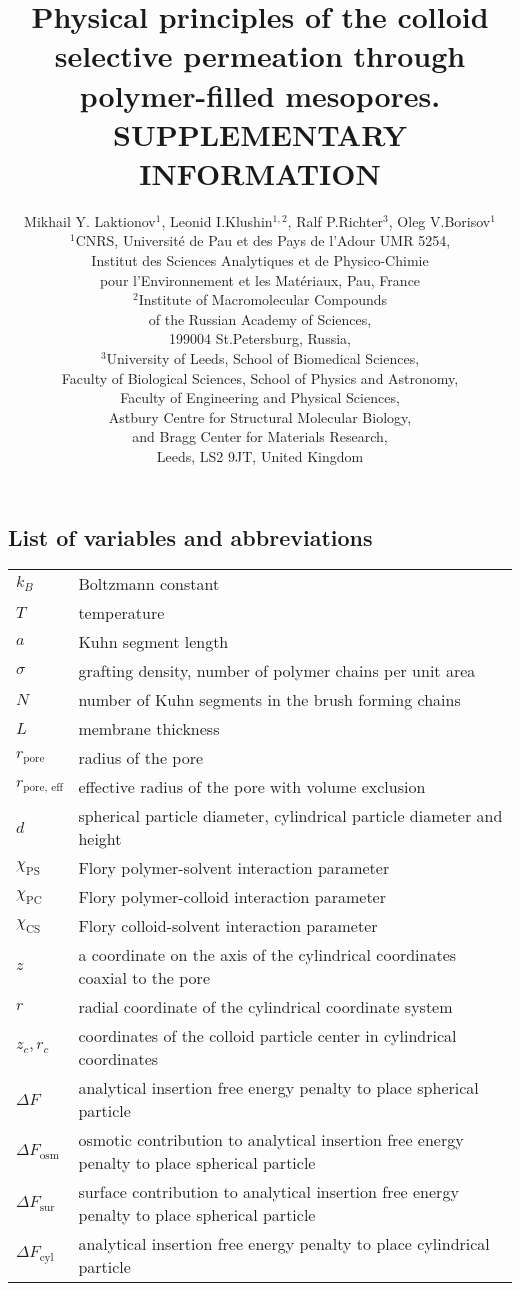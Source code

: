 \documentclass[10pt, a4paper]{article}
\title{Physical principles of the colloid selective permeation through polymer-filled mesopores.\\
        SUPPLEMENTARY INFORMATION}
\author{Mikhail Y. Laktionov$^1$, Leonid I.Klushin$^{1,2}$, Ralf P.Richter$^3$, Oleg V.Borisov$^1$\\
$^{1}$CNRS, Universit\'e de Pau et des Pays de l'Adour UMR 5254,\\
Institut des Sciences Analytiques et de Physico-Chimie\\
pour l'Environnement et les Mat\'eriaux, Pau, France \\
$^{2}$Institute of Macromolecular Compounds \\
of the Russian Academy of Sciences, \\
199004 St.Petersburg, Russia,\\
$^{3}$University of Leeds, School of Biomedical Sciences, \\
Faculty of Biological Sciences, 
School of Physics and Astronomy, \\
Faculty of Engineering and Physical Sciences,\\  
Astbury Centre for Structural Molecular Biology,\\ 
and Bragg Center for Materials Research,\\ 
Leeds, LS2 9JT, United Kingdom}
\begin{document}
\maketitle

\subsection*{List of variables and abbreviations}

\begin{tabularx}{\linewidth}{l l}
$k_B$ & Boltzmann constant \\
$T$ & temperature \\
$a$ & Kuhn segment length \\
$\sigma$ & grafting density, number of polymer chains per unit area \\
$N$ & number of Kuhn segments in the brush forming chains \\
$L$ & membrane thickness \\
$r_{\textrm{pore}}$ & radius of the pore \\
$r_{\textrm{pore, eff}}$ & effective radius of the pore with volume exclusion \\
$d$ & spherical particle diameter, cylindrical particle diameter and height \\ 
$\chi_{\textrm{PS}}$ & Flory polymer-solvent interaction parameter  \\
$\chi_{\textrm{PC}}$ & Flory polymer-colloid interaction parameter  \\
$\chi_{\textrm{CS}}$ & Flory colloid-solvent interaction parameter  \\
$z$ & a coordinate on the axis of the cylindrical coordinates coaxial to the pore \\
$r$ & radial coordinate of the cylindrical coordinate system \\
$z_{c}, r_{c}$ & coordinates of the colloid particle center in cylindrical coordinates \\
$\Delta F$ & analytical insertion free energy penalty to place spherical particle \\
$\Delta F_{\textrm{osm}}$ & osmotic contribution to analytical insertion free energy penalty to place spherical particle \\
$\Delta F_{\textrm{sur}}$ & surface contribution to analytical insertion free energy penalty to place spherical particle \\
$\Delta F_{\textrm{cyl}}$ & analytical insertion free energy penalty to place cylindrical particle \\

\end{tabularx}
\end{document}

